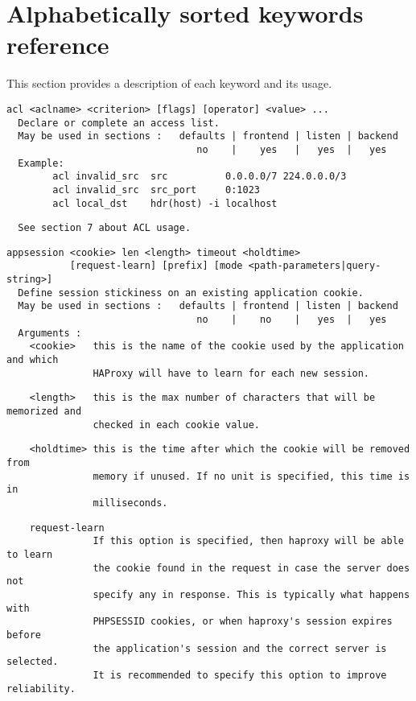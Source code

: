 
\section{Alphabetically sorted keywords reference}\label{keywords reference}

This section provides a description of each keyword and its usage.

\begin{verbatim}
acl <aclname> <criterion> [flags] [operator] <value> ...
  Declare or complete an access list.
  May be used in sections :   defaults | frontend | listen | backend
                                 no    |    yes   |   yes  |   yes
  Example:
        acl invalid_src  src          0.0.0.0/7 224.0.0.0/3
        acl invalid_src  src_port     0:1023
        acl local_dst    hdr(host) -i localhost
\end{verbatim}

\begin{verbatim}
  See section 7 about ACL usage.
\end{verbatim}

\begin{verbatim}
appsession <cookie> len <length> timeout <holdtime>
           [request-learn] [prefix] [mode <path-parameters|query-string>]
  Define session stickiness on an existing application cookie.
  May be used in sections :   defaults | frontend | listen | backend
                                 no    |    no    |   yes  |   yes
  Arguments :
    <cookie>   this is the name of the cookie used by the application and which
               HAProxy will have to learn for each new session.
\end{verbatim}

\begin{verbatim}
    <length>   this is the max number of characters that will be memorized and
               checked in each cookie value.
\end{verbatim}

\begin{verbatim}
    <holdtime> this is the time after which the cookie will be removed from
               memory if unused. If no unit is specified, this time is in
               milliseconds.
\end{verbatim}

\begin{verbatim}
    request-learn
               If this option is specified, then haproxy will be able to learn
               the cookie found in the request in case the server does not
               specify any in response. This is typically what happens with
               PHPSESSID cookies, or when haproxy's session expires before
               the application's session and the correct server is selected.
               It is recommended to specify this option to improve reliability.
\end{verbatim}

